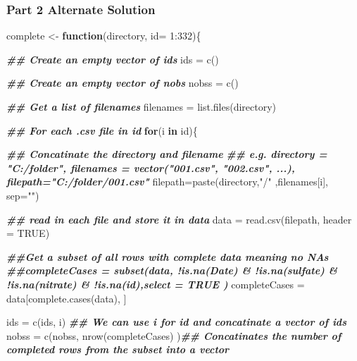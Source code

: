 \documentclass[
]{article}
\newenvironment{Shaded}{\begin{snugshade}}{\end{snugshade}}
\newcommand{\AttributeTok}[1]{\textcolor[rgb]{0.77,0.63,0.00}{#1}}
\newcommand{\ConstantTok}[1]{\textcolor[rgb]{0.00,0.00,0.00}{#1}}
\newcommand{\ControlFlowTok}[1]{\textcolor[rgb]{0.13,0.29,0.53}{\textbf{#1}}}
\newcommand{\DecValTok}[1]{\textcolor[rgb]{0.00,0.00,0.81}{#1}}
\newcommand{\DocumentationTok}[1]{\textcolor[rgb]{0.56,0.35,0.01}{\textbf{\textit{#1}}}}
\newcommand{\FunctionTok}[1]{\textcolor[rgb]{0.00,0.00,0.00}{#1}}
\newcommand{\NormalTok}[1]{#1}
\newcommand{\OtherTok}[1]{\textcolor[rgb]{0.56,0.35,0.01}{#1}}
\newcommand{\SpecialCharTok}[1]{\textcolor[rgb]{0.00,0.00,0.00}{#1}}
\newcommand{\StringTok}[1]{\textcolor[rgb]{0.31,0.60,0.02}{#1}}
\begin{document}
\hypertarget{part-2-alternate-solution}{%
\subsubsection{Part 2 Alternate
Solution}\label{part-2-alternate-solution}}

\begin{Shaded}
\begin{Highlighting}[]
\NormalTok{complete }\OtherTok{\textless{}{-}} \ControlFlowTok{function}\NormalTok{(directory, }\AttributeTok{id=} \DecValTok{1}\SpecialCharTok{:}\DecValTok{332}\NormalTok{)\{}
  
  \DocumentationTok{\#\# Create an empty vector of id\textquotesingle{}s}
\NormalTok{  ids }\OtherTok{=} \FunctionTok{c}\NormalTok{()}
  
  \DocumentationTok{\#\# Create an empty vector of nobs}
\NormalTok{  nobss }\OtherTok{=} \FunctionTok{c}\NormalTok{()}
  
  \DocumentationTok{\#\# Get a list of filenames}
\NormalTok{  filenames }\OtherTok{=} \FunctionTok{list.files}\NormalTok{(directory)}
  
  \DocumentationTok{\#\# For each .csv file in id}
  \ControlFlowTok{for}\NormalTok{(i }\ControlFlowTok{in}\NormalTok{ id)\{}
    
    \DocumentationTok{\#\# Concatinate the directory and filename}
    \DocumentationTok{\#\# e.g. directory = "C:/folder", filenames = vector("001.csv", "002.csv", ...), filepath="C:/folder/001.csv"}
\NormalTok{    filepath}\OtherTok{=}\FunctionTok{paste}\NormalTok{(directory,}\StringTok{"/"}\NormalTok{ ,filenames[i], }\AttributeTok{sep=}\StringTok{""}\NormalTok{)}
    
    \DocumentationTok{\#\# read in each file and store it in data}
\NormalTok{    data }\OtherTok{=} \FunctionTok{read.csv}\NormalTok{(filepath, }\AttributeTok{header =} \ConstantTok{TRUE}\NormalTok{)}
    
    \DocumentationTok{\#\#Get a subset of all rows with complete data meaning no NA\textquotesingle{}s}
    \DocumentationTok{\#\#completeCases = subset(data, !is.na(Date) \& !is.na(sulfate) \& !is.na(nitrate) \& !is.na(id),select = TRUE )}
\NormalTok{    completeCases }\OtherTok{=}\NormalTok{ data[}\FunctionTok{complete.cases}\NormalTok{(data), ]}
    
\NormalTok{    ids }\OtherTok{=}  \FunctionTok{c}\NormalTok{(ids, i)                    }\DocumentationTok{\#\# We can use i for id and concatinate a vector of id\textquotesingle{}s}
\NormalTok{    nobss }\OtherTok{=} \FunctionTok{c}\NormalTok{(nobss, }\FunctionTok{nrow}\NormalTok{(completeCases) )}\DocumentationTok{\#\# Concatinates the number of completed rows from the subset into a vector}
   

\end{Highlighting}
\end{Shaded}
\end{document}
